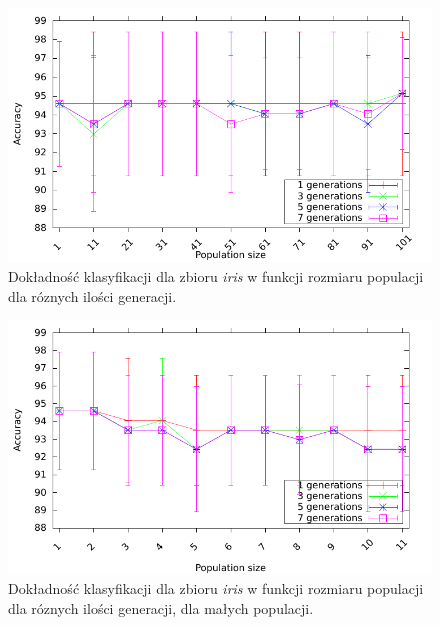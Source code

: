 	\begin{figure}
		\includegraphics[scale=0.90]{figures/accuracy/accuracy-iris}
		\caption{Dokładność klasyfikacji dla zbioru \emph{iris} w funkcji rozmiaru populacji dla róznych ilości generacji.\label{fig:acc-iris}}
	\end{figure}
	
	\begin{figure}
		\includegraphics[scale=0.90]{figures/accuracy/accuracy-iris-detailed}
		\caption{Dokładność klasyfikacji dla zbioru \emph{iris} w funkcji rozmiaru populacji dla róznych ilości generacji, dla małych populacji.	\label{fig:acc-iris-detailed}}
	\end{figure}	
	
